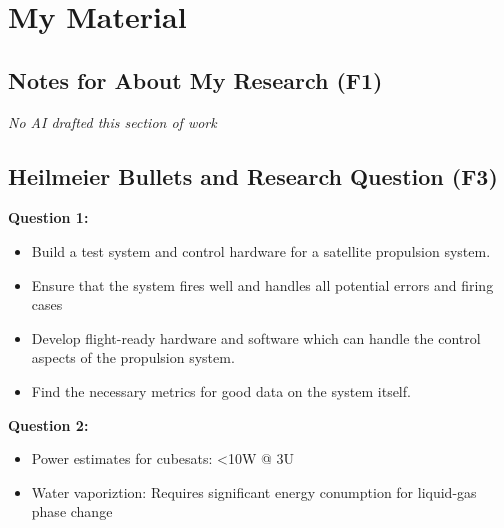 
\section{My Material}

\subsection{Notes for About My Research (F1)}

\textit{No AI drafted this section of work}

\subsection{Heilmeier Bullets and Research Question (F3)}

\textbf{Question 1:}
\begin{itemize}
    \item Build a test system and control hardware for a satellite propulsion system.
    \item Ensure that the system fires well and handles all potential errors and firing cases
    \item Develop flight-ready hardware and software which can handle the control aspects of the propulsion system.
    \item Find the necessary metrics for good data on the system itself.
\end{itemize}

\textbf{Question 2:}
\begin{itemize}
    \item Power estimates for cubesats: <10W @ 3U
    \item Water vaporiztion: Requires significant energy conumption for liquid-gas phase change
\end{itemize}

